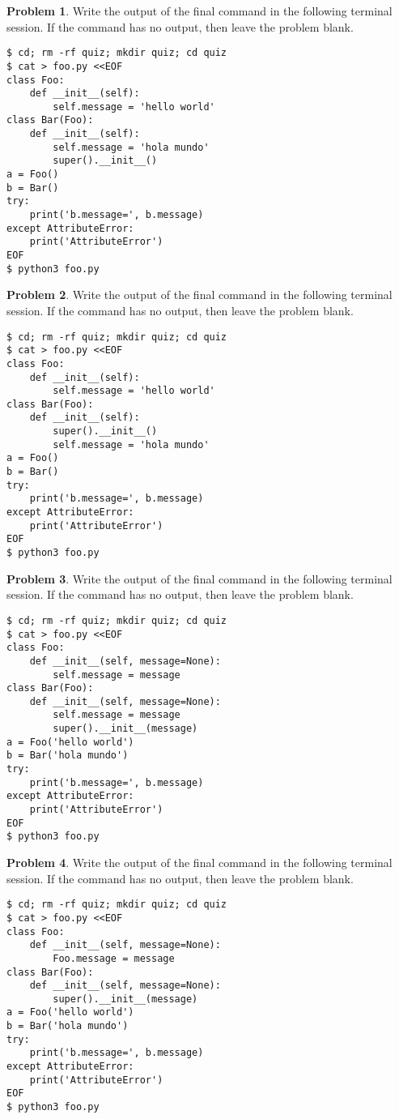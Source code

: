 \documentclass[10pt]{article}
\theoremstyle{definition}
\newtheorem{problem}{Problem}
\begin{document}
\filbreak
\begin{problem}
    Write the output of the final command in the following terminal session.
    If the command has no output, then leave the problem blank.
\end{problem}
\begin{lstlisting}
$ cd; rm -rf quiz; mkdir quiz; cd quiz
$ cat > foo.py <<EOF
class Foo:
    def __init__(self):
        self.message = 'hello world'
class Bar(Foo):
    def __init__(self):
        self.message = 'hola mundo'
        super().__init__()
a = Foo()
b = Bar()
try:
    print('b.message=', b.message)
except AttributeError:
    print('AttributeError') 
EOF
$ python3 foo.py
\end{lstlisting}


\filbreak
\begin{problem}
    Write the output of the final command in the following terminal session.
    If the command has no output, then leave the problem blank.
\end{problem}
\begin{lstlisting}
$ cd; rm -rf quiz; mkdir quiz; cd quiz
$ cat > foo.py <<EOF
class Foo:
    def __init__(self):
        self.message = 'hello world'
class Bar(Foo):
    def __init__(self):
        super().__init__()
        self.message = 'hola mundo'
a = Foo()
b = Bar()
try:
    print('b.message=', b.message)
except AttributeError:
    print('AttributeError') 
EOF
$ python3 foo.py
\end{lstlisting}

\filbreak
\begin{problem}
    Write the output of the final command in the following terminal session.
    If the command has no output, then leave the problem blank.
\end{problem}
\begin{lstlisting}
$ cd; rm -rf quiz; mkdir quiz; cd quiz
$ cat > foo.py <<EOF
class Foo:
    def __init__(self, message=None):
        self.message = message
class Bar(Foo):
    def __init__(self, message=None):
        self.message = message
        super().__init__(message)
a = Foo('hello world')
b = Bar('hola mundo')
try:
    print('b.message=', b.message)
except AttributeError:
    print('AttributeError') 
EOF
$ python3 foo.py
\end{lstlisting}


\filbreak
\begin{problem}
    Write the output of the final command in the following terminal session.
    If the command has no output, then leave the problem blank.
\end{problem}
\begin{lstlisting}
$ cd; rm -rf quiz; mkdir quiz; cd quiz
$ cat > foo.py <<EOF
class Foo:
    def __init__(self, message=None):
        Foo.message = message
class Bar(Foo):
    def __init__(self, message=None):
        super().__init__(message)
a = Foo('hello world')
b = Bar('hola mundo')
try:
    print('b.message=', b.message)
except AttributeError:
    print('AttributeError') 
EOF
$ python3 foo.py
\end{lstlisting}
\end{document}
